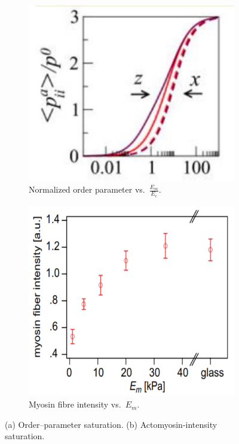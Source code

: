 \documentclass{article}
\begin{document}
\begin{figure}[h!]
  \centering
  \begin{subfigure}[b]{0.45\textwidth}
    \includegraphics[width=\textwidth]{order_parameter}
    \caption{Normalized order parameter vs.\ \(\frac{E_m}{E_c}\).}
    \label{fig:order_parameter}
  \end{subfigure}
  \quad
  \begin{subfigure}[b]{0.45\textwidth}
    \includegraphics[width=\textwidth]{actomyosin}
    \caption{Myosin fibre intensity vs.\ \(E_m\).}
    \label{fig:myosin}
  \end{subfigure}
  \caption{(a) Order–parameter saturation. (b) Actomyosin‐intensity saturation.}
  \label{fig:combined}
\end{figure}
\end{document}

